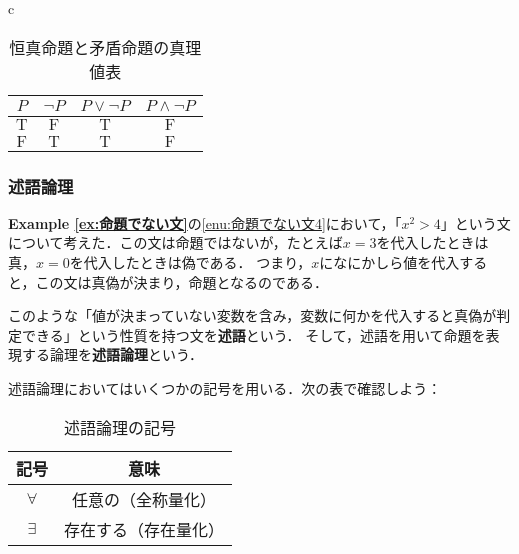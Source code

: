 \documentclass[a4paper,11pt]{ltjsarticle}
\renewcommand{\emph}[1]{\textbf{#1}}
\newcommand{\exref}[1]{{\bfseries\sffamily Example \ref{ex:#1}}}
\begin{document}
\begin{table}[htbp]
\begin{center}
\begin{tabular}{c}
      \begin{minipage}{0.3\hsize}
        \begin{center}
          \caption{恒真命題と矛盾命題の真理値表}
          \label{fig:恒真命題と矛盾命題の真理値表}
          \begin{tabular}{|c|c|c|c|} \hline
            $ P$          & $\lnot P$     & $ P \lor \lnot P $ & $P \land \lnot P$ \\ \hline
            $\mathrm{T} $ & $\mathrm{F} $ & $\mathrm{T}$       & $\mathrm{F}$      \\ \hline
            $\mathrm{F} $ & $\mathrm{T}$  & $\mathrm{T}$       & $\mathrm{F}$      \\\hline
          \end{tabular}
        \end{center}
      \end{minipage}
    \end{tabular}
  \end{center}
\end{table}

\subsubsection{述語論理}

\exref{命題でない文}の\ref{enu:命題でない文4}において，「$x^2 >4$」という文について考えた．この文は命題ではないが，たとえば$x=3$を代入したときは真，$x=0$を代入したときは偽である．
つまり，$x$になにかしら値を代入すると，この文は真偽が決まり，命題となるのである．

このような「値が決まっていない変数を含み，変数に何かを代入すると真偽が判定できる」という性質を持つ文を\emph{述語}という．
そして，述語を用いて命題を表現する論理を\emph{述語論理}という．


述語論理においてはいくつかの記号を用いる．次の表で確認しよう：

\begin{table}[ht]
  \centering
  \caption{述語論理の記号}
  \begin{tabular}{c|c}
    \hline
    記号        & 意味                              \\
    \hline
    $\forall$ & 任意の（全称量化\index{ぜんしょうりょうか@全称量化}） \\
    $\exists$ & 存在する（存在量化\index{そんざいりょうか@存在量化}） \\
    \hline
  \end{tabular}
\end{table}
\end{document}
